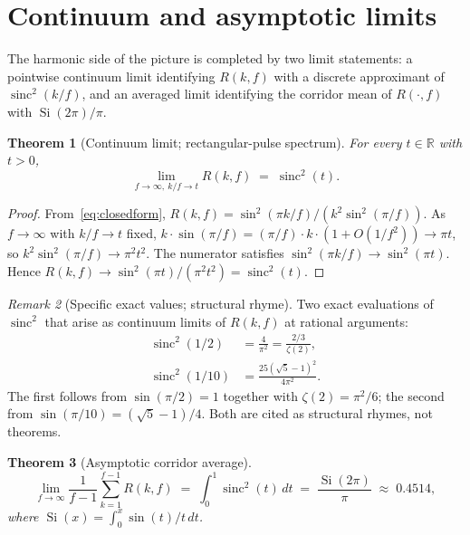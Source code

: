\documentclass[11pt,reqno]{amsart}
\theoremstyle{plain}
\newtheorem{theorem}{Theorem}[section]
\theoremstyle{definition}
\theoremstyle{remark}
\newtheorem{remark}[theorem]{Remark}
\DeclareMathOperator{\sinc}{sinc}
\DeclareMathOperator{\Si}{Si}
\newcommand{\R}{\mathbb{R}}
\begin{document}
\section{Continuum and asymptotic limits}\label{sec:asymptotic}

The harmonic side of the picture is completed by two limit statements:
a pointwise continuum limit identifying $R(k, f)$ with a discrete
approximant of $\sinc^{2}(k/f)$, and an averaged limit identifying the
corridor mean of $R(\cdot, f)$ with $\Si(2\pi)/\pi$.

\begin{theorem}[Continuum limit; rectangular-pulse spectrum]\label{thm:limit}
For every $t \in \R$ with $t > 0$,
\[
  \lim_{f \to \infty,\ k/f \to t} R(k, f) \;=\; \sinc^{2}(t).
\]
\end{theorem}

\begin{proof}
From~\eqref{eq:closedform}, $R(k, f) = \sin^{2}(\pi k/f) /
(k^{2} \sin^{2}(\pi/f))$. As $f \to \infty$ with $k/f \to t$ fixed,
$k \cdot \sin(\pi/f) = (\pi/f) \cdot k \cdot (1 + O(1/f^{2}))
\to \pi t$, so $k^{2} \sin^{2}(\pi/f) \to \pi^{2} t^{2}$. The
numerator satisfies $\sin^{2}(\pi k/f) \to \sin^{2}(\pi t)$. Hence
$R(k, f) \to \sin^{2}(\pi t)/(\pi^{2} t^{2}) = \sinc^{2}(t)$.
\end{proof}

\begin{remark}[Specific exact values; structural rhyme]\label{rem:exactvalues}
Two exact evaluations of $\sinc^{2}$ that arise as continuum limits of
$R(k, f)$ at rational arguments:
\begin{align*}
  \sinc^{2}(1/2) &= \frac{4}{\pi^{2}} = \frac{2/3}{\zeta(2)}, \\
  \sinc^{2}(1/10) &= \frac{25(\sqrt{5}-1)^{2}}{4\pi^{2}}.
\end{align*}
The first follows from $\sin(\pi/2) = 1$ together with
$\zeta(2) = \pi^{2}/6$; the second from $\sin(\pi/10) = (\sqrt{5}-1)/4$.
Both are cited as structural rhymes, not theorems.
\end{remark}

\begin{theorem}[Asymptotic corridor average]\label{thm:asymptotic}
\[
  \lim_{f \to \infty}
  \frac{1}{f - 1} \sum_{k=1}^{f-1} R(k, f)
  \;=\;
  \int_{0}^{1} \sinc^{2}(t)\, dt
  \;=\;
  \frac{\Si(2\pi)}{\pi}
  \;\approx\; 0.4514,
\]
where $\Si(x) = \int_{0}^{x} \sin(t)/t\, dt$.
\end{theorem}
\end{document}
